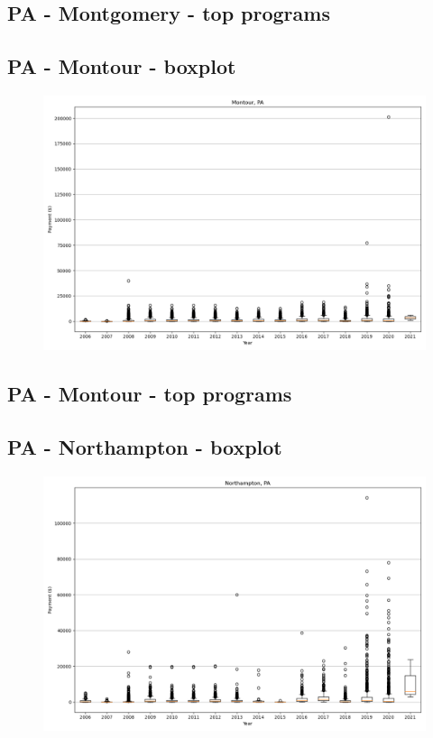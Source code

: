 \subsection*{PA - Montgomery - top programs}

\newpage
\subsection*{PA - Montour - boxplot}
\begin{figure}[h]
\centering
\includegraphics[width=7in]{../output/boxplots/counties/Montour-PA_boxplot.png}
\end{figure}


\subsection*{PA - Montour - top programs}

\newpage
\subsection*{PA - Northampton - boxplot}
\begin{figure}[h]
\centering
\includegraphics[width=7in]{../output/boxplots/counties/Northampton-PA_boxplot.png}
\end{figure}


